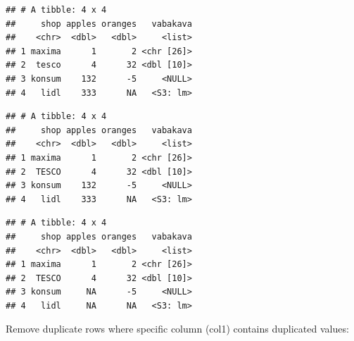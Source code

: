 \documentclass[]{book}
\newenvironment{Shaded}{\begin{snugshade}}{\end{snugshade}}
\newcommand{\DecValTok}[1]{\textcolor[rgb]{0.00,0.00,0.81}{#1}}
\newcommand{\StringTok}[1]{\textcolor[rgb]{0.31,0.60,0.02}{#1}}
\newcommand{\OtherTok}[1]{\textcolor[rgb]{0.56,0.35,0.01}{#1}}
\newcommand{\OperatorTok}[1]{\textcolor[rgb]{0.81,0.36,0.00}{\textbf{#1}}}
\newcommand{\NormalTok}[1]{#1}
\begin{document}
\begin{Shaded}
\end{Shaded}

\begin{verbatim}
## # A tibble: 4 x 4
##     shop apples oranges   vabakava
##    <chr>  <dbl>   <dbl>     <list>
## 1 maxima      1       2 <chr [26]>
## 2  tesco      4      32 <dbl [10]>
## 3 konsum    132      -5     <NULL>
## 4   lidl    333      NA   <S3: lm>
\end{verbatim}

\begin{Shaded}
\end{Shaded}

\begin{verbatim}
## # A tibble: 4 x 4
##     shop apples oranges   vabakava
##    <chr>  <dbl>   <dbl>     <list>
## 1 maxima      1       2 <chr [26]>
## 2  TESCO      4      32 <dbl [10]>
## 3 konsum    132      -5     <NULL>
## 4   lidl    333      NA   <S3: lm>
\end{verbatim}

\begin{Shaded}
\end{Shaded}

\begin{verbatim}
## # A tibble: 4 x 4
##     shop apples oranges   vabakava
##    <chr>  <dbl>   <dbl>     <list>
## 1 maxima      1       2 <chr [26]>
## 2  TESCO      4      32 <dbl [10]>
## 3 konsum     NA      -5     <NULL>
## 4   lidl     NA      NA   <S3: lm>
\end{verbatim}

Remove duplicate rows where specific column (col1) contains duplicated
values:
\end{document}
